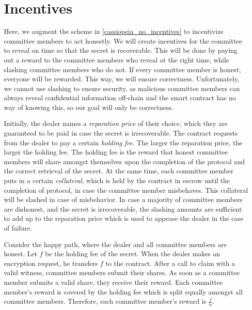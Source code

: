 \section{Incentives}
Here, we augment the scheme in \ref{cassiopeia_no_incentives} to incentivize committee members to act honestly.
We will create incentives for the committee to reveal on time so that the secret is recoverable.
This will be done by paying out a reward to the committee members who reveal at the right time, while slashing committee members who do not.
If every committee member is honest, everyone will be rewarded.
This way, we will ensure correctness.
Unfortunately, we cannot use slashing to ensure security, as malicious committee members can always reveal confidential information off-chain and the smart contract has no way of knowing this, so our goal will only be correctness.

Initially, the dealer names a \emph{reparation price} of their choice, which they are guaranteed to be paid in case the secret is irrecoverable.
The contract requests from the dealer to pay a certain \emph{holding fee}.
The larger the reparation price, the larger the holding fee. 
The holding fee is the reward that honest committee members will share amongst themselves upon the completion of the protocol and the correct retrieval of the secret.
At the same time, each committee member puts in a certain \emph{collateral}, which is held by the contract in escrow until the completion of protocol, in case the committee member misbehaves.
This collateral will be slashed in case of misbehavior.
In case a majority of committee members are dishonest, and the secret is irrecoverable, the slashing amounts are sufficient to add up to the reparation price which is used to appease the dealer in the case of failure.

Consider the happy path, where the dealer and all committee members are honest.
Let $f$ be the holding fee of the secret.
When the dealer makes an encryption request, he transfers $f$ to the contract.
After a call to \textsf{claim} with a valid witness, committee members submit their shares.
As soon as a committee member submits a valid share, they receive their reward.
Each committee member's reward is covered by the holding fee which is split equally amongst all committee members.
Therefore, each committee member's reward is $\frac{f}{n}$.

